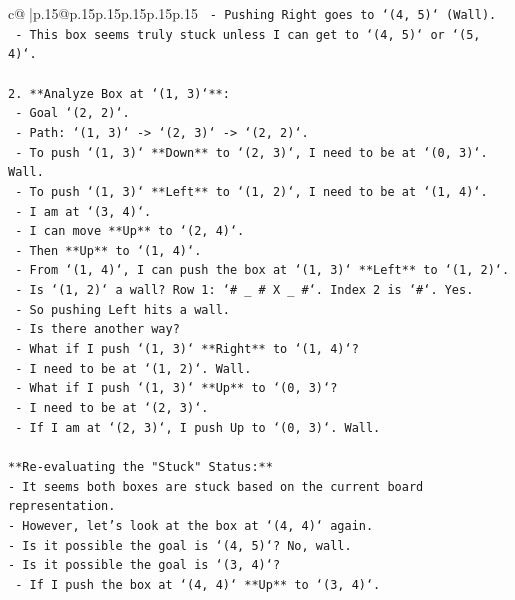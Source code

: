 \documentclass{article}
\begin{document}
{\begin{supertabular}{c@{$\;$}|p{.15\linewidth}@{}p{.15\linewidth}p{.15\linewidth}p{.15\linewidth}p{.15\linewidth}p{.15\linewidth}}
{{{\texttt{    {-}   Pushing Right goes to `(4, 5)` (Wall).} \\
\texttt{    {-}   This box seems truly stuck unless I can get to `(4, 5)` or `(5, 4)`.} \\
\\ 
\texttt{2.  **Analyze Box at `(1, 3)`**:} \\
\texttt{    {-}   Goal `(2, 2)`.} \\
\texttt{    {-}   Path: `(1, 3)` {-}> `(2, 3)` {-}> `(2, 2)`.} \\
\texttt{    {-}   To push `(1, 3)` **Down** to `(2, 3)`, I need to be at `(0, 3)`. Wall.} \\
\texttt{    {-}   To push `(1, 3)` **Left** to `(1, 2)`, I need to be at `(1, 4)`.} \\
\texttt{    {-}   I am at `(3, 4)`.} \\
\texttt{    {-}   I can move **Up** to `(2, 4)`.} \\
\texttt{    {-}   Then **Up** to `(1, 4)`.} \\
\texttt{    {-}   From `(1, 4)`, I can push the box at `(1, 3)` **Left** to `(1, 2)`.} \\
\texttt{    {-}   Is `(1, 2)` a wall? Row 1: `\# \_ \# X \_ \#`. Index 2 is `\#`. Yes.} \\
\texttt{    {-}   So pushing Left hits a wall.} \\
\texttt{    {-}   Is there another way?} \\
\texttt{    {-}   What if I push `(1, 3)` **Right** to `(1, 4)`?} \\
\texttt{        {-}   I need to be at `(1, 2)`. Wall.} \\
\texttt{    {-}   What if I push `(1, 3)` **Up** to `(0, 3)`?} \\
\texttt{        {-}   I need to be at `(2, 3)`.} \\
\texttt{        {-}   If I am at `(2, 3)`, I push Up to `(0, 3)`. Wall.} \\
\\ 
\texttt{**Re{-}evaluating the "Stuck" Status:**} \\
\texttt{{-}   It seems both boxes are stuck based on the current board representation.} \\
\texttt{{-}   However, let's look at the box at `(4, 4)` again.} \\
\texttt{{-}   Is it possible the goal is `(4, 5)`? No, wall.} \\
\texttt{{-}   Is it possible the goal is `(3, 4)`?} \\
\texttt{    {-}   If I push the box at `(4, 4)` **Up** to `(3, 4)`.} \\
}}}
\end{supertabular}}
\end{document}
